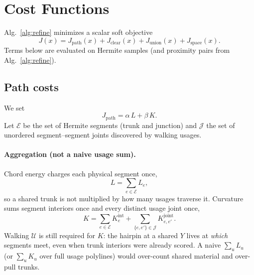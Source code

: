 
\section{Cost Functions}
\label{sec:costs}

Alg.~\ref{alg:refine} minimizes a scalar soft objective
\begin{equation}
\label{eq:J}
J(x)
=
J_{\mathrm{path}}(x)
+
J_{\mathrm{clear}}(x)
+
J_{\mathrm{union}}(x)
+
J_{\mathrm{space}}(x).
\end{equation}
Terms below are evaluated on Hermite samples (and proximity pairs from
Alg.~\ref{alg:refine}).

\subsection{Path costs}
\label{sec:costs:path}

We set
\begin{equation}
J_{\mathrm{path}}
=
\alpha\,L
+
\beta\,K.
\end{equation}
Let $\mathcal{E}$ be the set of Hermite segments (trunk and junction) and
$\mathcal{J}$ the set of unordered segment--segment joints discovered by walking
usages.

\paragraph{Aggregation (not a naive usage sum).}
Chord energy charges each physical segment once,
\begin{equation}
L
=
\sum_{e\in\mathcal{E}}
L_e,
\end{equation}
so a shared trunk is not multiplied by how many usages traverse it.
Curvature sums segment interiors once and every distinct usage joint once,
\begin{equation}
K
=
\sum_{e\in\mathcal{E}}
K_e^{\mathrm{int}}
+
\sum_{\{e,e'\}\in\mathcal{J}}
K_{e,e'}^{\mathrm{joint}}.
\end{equation}
Walking $\mathcal{U}$ is still required for $K$: the hairpin at a shared $Y$
lives at \emph{which} segments meet, even when trunk interiors were already
scored.
A naive $\sum_u L_u$ (or $\sum_u K_u$ over full usage polylines) would
over-count shared material and over-pull trunks.

